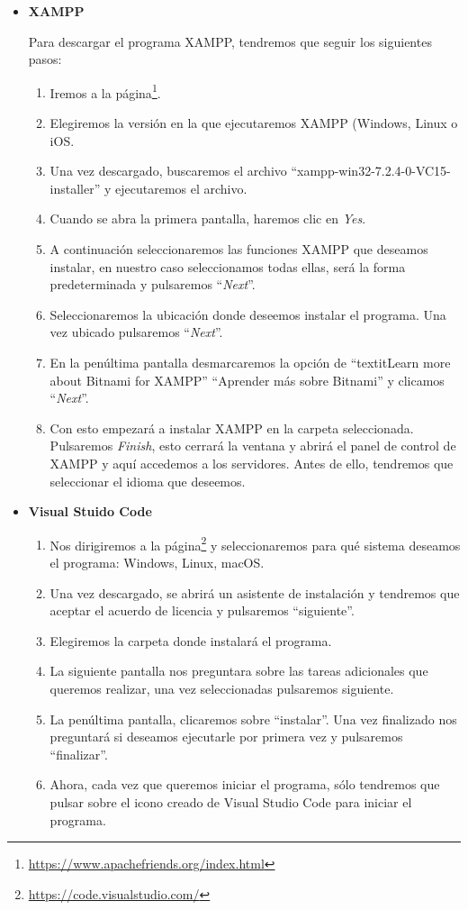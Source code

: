 \begin{itemize}
		
	\item \textbf{XAMPP}
	
Para descargar el programa XAMPP, tendremos que seguir los siguientes pasos:	
	\begin{enumerate}
		\item Iremos a la página\footnote{\url{https://www.apachefriends.org/index.html}}.
		\item Elegiremos la versión en la que ejecutaremos XAMPP (Windows, Linux o iOS.
		\item Una vez descargado, buscaremos el archivo ``xampp-win32-7.2.4-0-VC15-installer'' y ejecutaremos el archivo.
		\item Cuando se abra la primera pantalla, haremos clic en \textit{Yes}.
		\item A continuación seleccionaremos las funciones XAMPP que deseamos instalar, en nuestro caso seleccionamos todas ellas, será la forma predeterminada y pulsaremos ``\textit{Next}''.
		\item Seleccionaremos la ubicación donde deseemos instalar el programa. Una vez ubicado pulsaremos ``\textit{Next}''.
		\item En la penúltima pantalla desmarcaremos la opción de ``textit{Learn more about Bitnami for XAMPP}'' ``Aprender más sobre Bitnami'' y clicamos ``\textit{Next}''.
		\item Con esto empezará a instalar XAMPP en la carpeta seleccionada. Pulsaremos \textit{Finish}, esto cerrará la ventana y abrirá el panel de control de XAMPP y aquí accedemos a los servidores. Antes de ello, tendremos que seleccionar el idioma que deseemos. 
	\end{enumerate}	
	\item \textbf{Visual Stuido Code}
	\begin{enumerate}
		\item Nos dirigiremos a la página\footnote{\url{https://code.visualstudio.com/}} y seleccionaremos para qué sistema deseamos el programa: Windows, Linux, macOS.
		\item Una vez descargado, se abrirá un asistente de instalación y tendremos que aceptar el acuerdo de licencia y pulsaremos ``siguiente''.
		\item Elegiremos la carpeta donde instalará el programa.
		\item La siguiente pantalla nos preguntara sobre las tareas adicionales que queremos realizar, una vez seleccionadas pulsaremos siguiente.
		 \item La penúltima pantalla, clicaremos sobre ``instalar''. Una vez finalizado nos preguntará si deseamos ejecutarle por primera vez y pulsaremos ``finalizar''.
		 \item  Ahora, cada vez que queremos iniciar el programa, sólo tendremos que pulsar sobre el icono creado de Visual Studio Code para iniciar el programa. 
	\end{enumerate}	
\end{itemize}

